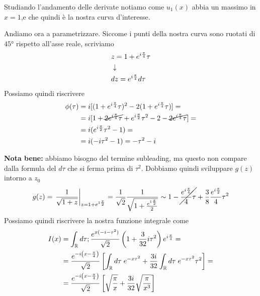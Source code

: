 Studiando l'andamento delle derivate notiamo come $u_1(x)$ abbia un massimo in $x=1$,e che quindi è la nostra curva d'interesse.

Andiamo ora a parametrizzare. Siccome i punti della nostra curva sono ruotati di $45°$ rispetto all'asse reale, scriviamo
\begin{align}
	&z = 1+ e^{i\frac{\pi}{4}} \tau\\ &\downarrow \nonumber \\
	&dz = e^{i\frac{\pi}{4}} d\tau
\end{align}	
Possiamo quindi riscrivere
\begin{align}	
	\phi(\tau) &= i[(1+ e^{i\frac{\pi}{4}} \tau)^2-2(1+ e^{i\frac{\pi}{4}} \tau)] =\nonumber\\
	&= i[ 1 + \cancel{2e^{i\frac{\pi}{4}}\tau} + e^{i\frac{\pi}{2}}\tau^2 - 2 -\cancel{2e^{i\frac{\pi}{4}}\tau} ]=\nonumber\\
	&= i (e^{i\frac{\pi}{2}}\tau^2 -1)=\nonumber\\
	&= i (-i\tau^2 -1) = -\tau^2 -i
\end{align}

\textbf{Nota bene:} abbiamo bisogno del termine subleading, ma questo non compare dalla formula del $d\tau$ che si ferma prima di $\tau^2$. Dobbiamo quindi sviluppare $g(z)$ intorno a $z_0$
\begin{align}
	g(z) = \left. \frac{1}{\sqrt{1+z}} \right|_{z=1 + e^{1\frac{\pi}{2}}} = \frac{1}{\sqrt{2}} \frac{1}{\sqrt{1 + \frac{e^{1\frac{\pi}{2}}}{2}}} \sim 1 - \cancel{\frac{e^{i\frac{\pi}{4}}}{4}\tau} + \frac{3}{8} \frac{e^{i\frac{\pi}{2}}}{4} \tau^2
\end{align}
Possiamo quindi riscrivere la nostra funzione integrale come
\begin{align}
	I(x) &= \int_{\mathbb{R}} d\tau; \frac{e^{x(-i-\tau^2)}}{\sqrt{2}} \left( 1  + \frac{3}{32} i \tau^2 \right)e^{i\frac{\pi}{4}} = \nonumber \\
	&= \frac{e^{-i\left( x-\frac{\pi}{4} \right)}}{\sqrt{2}}\left[ \int_{\mathbb{R}} d\tau  \; e^{-x\tau^2}  + \frac{3i}{32} \int_{\mathbb{R}} d\tau \; e^{-x\tau^2} \tau^2\right] = \nonumber \\
	&= \frac{e^{-i\left( x-\frac{\pi}{4} \right)}}{\sqrt{2}}\left[ \sqrt{\frac{\pi}{x}}   + \frac{3i}{32} \sqrt{\frac{\pi}{x^3}} \right]
\end{align}

